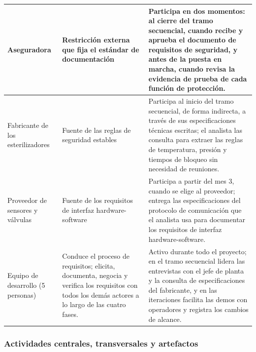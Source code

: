 \documentclass[12pt,a4paper]{article}
\begin{document}
\begin{longtable}{>{\raggedright\arraybackslash}p{2.8cm} >{\raggedright\arraybackslash}p{5.0cm} >{\raggedright\arraybackslash}p{6.7cm}}
\midrule
Aseguradora &
Restricción externa que fija el estándar de documentación &
Participa en dos momentos: al cierre del tramo secuencial, cuando recibe y aprueba el documento de requisitos de seguridad, y antes de la puesta en marcha, cuando revisa la evidencia de prueba de cada función de protección. \\
\midrule
Fabricante de los esterilizadores &
Fuente de las reglas de seguridad estables &
Participa al inicio del tramo secuencial, de forma indirecta, a través de sus especificaciones técnicas escritas; el analista las consulta para extraer las reglas de temperatura, presión y tiempos de bloqueo sin necesidad de reuniones. \\
\midrule
Proveedor de sensores y válvulas &
Fuente de los requisitos de interfaz hardware-software &
Participa a partir del mes 3, cuando se elige al proveedor; entrega las especificaciones del protocolo de comunicación que el analista usa para documentar los requisitos de interfaz hardware-software. \\
\midrule
Equipo de desarrollo (5 personas) &
Conduce el proceso de requisitos; elicita, documenta, negocia y verifica los requisitos con todos los demás actores a lo largo de las cuatro fases. &
Activo durante todo el proyecto; en el tramo secuencial lidera las entrevistas con el jefe de planta y la consulta de especificaciones del fabricante, y en las iteraciones facilita las demos con operadores y registra los cambios de alcance. \\
\bottomrule
\end{longtable}
\endgroup

\subsubsection{Actividades centrales, transversales y artefactos}
\end{document}
